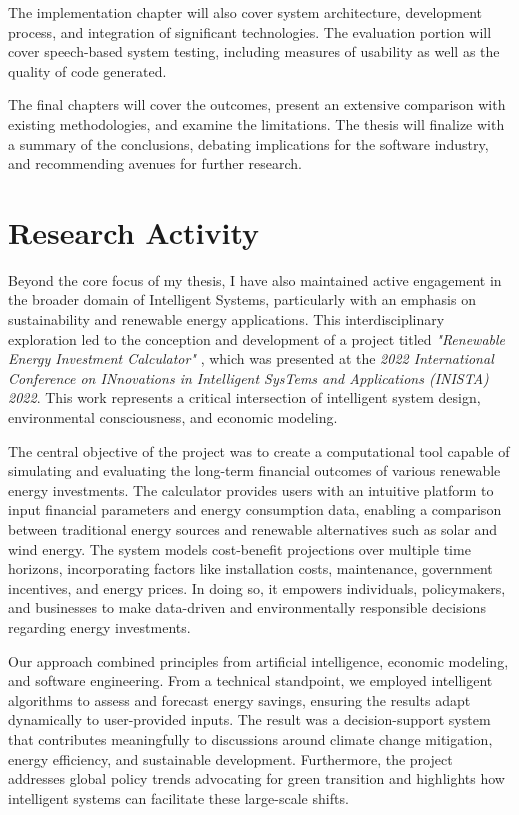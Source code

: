 The implementation chapter will also cover system architecture, development process, and integration of significant technologies. The evaluation portion will cover speech-based system testing, including measures of usability as well as the quality of code generated.

The final chapters will cover the outcomes, present an extensive comparison with existing methodologies, and examine the limitations. The thesis will finalize with a summary of the conclusions, debating implications for the software industry, and recommending avenues for further research.

\section{Research Activity}
Beyond the core focus of my thesis, I have also maintained active engagement in the broader domain of Intelligent Systems, particularly with an emphasis on sustainability and renewable energy applications. This interdisciplinary exploration led to the conception and development of a project titled \textit{"Renewable Energy Investment Calculator"} \cite{9894203}, which was presented at the \textit{2022 International Conference on INnovations in Intelligent SysTems and Applications (INISTA) 2022}. This work represents a critical intersection of intelligent system design, environmental consciousness, and economic modeling.

The central objective of the project was to create a computational tool capable of simulating and evaluating the long-term financial outcomes of various renewable energy investments. The calculator provides users with an intuitive platform to input financial parameters and energy consumption data, enabling a comparison between traditional energy sources and renewable alternatives such as solar and wind energy. The system models cost-benefit projections over multiple time horizons, incorporating factors like installation costs, maintenance, government incentives, and energy prices. In doing so, it empowers individuals, policymakers, and businesses to make data-driven and environmentally responsible decisions regarding energy investments.

Our approach combined principles from artificial intelligence, economic modeling, and software engineering. From a technical standpoint, we employed intelligent algorithms to assess and forecast energy savings, ensuring the results adapt dynamically to user-provided inputs. The result was a decision-support system that contributes meaningfully to discussions around climate change mitigation, energy efficiency, and sustainable development. Furthermore, the project addresses global policy trends advocating for green transition and highlights how intelligent systems can facilitate these large-scale shifts.

